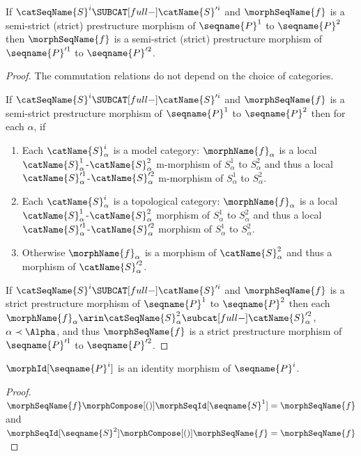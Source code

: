 \documentclass{article}
\begin{document}
\begin{lemma}
If $\catSeqName{S}^i \SUBCAT[full-] \catName{S}'^i$ and
$\morphSeqName{f}$ is a semi-strict (strict) prestructure morphism of
$\seqname{P}^1$ to $\seqname{P}^2$ then $\morphSeqName{f}$ is a
semi-strict (strict) prestructure morphism of $\seqname{P}'^1$ to
$\seqname{P}'^2$.

\begin{proof}
The commutation relations do not depend on the choice of categories.

If $\catSeqName{S}^i \SUBCAT[full-] \catName{S}'^i$ and
$\morphSeqName{f}$ is a semi-strict prestructure morphism of
$\seqname{P}^1$ to $\seqname{P}^2$ then for each $\alpha$, if

\begin{enumerate}
\item Each $\catName{S}^i_\alpha$ is a model category:
$\morphName{f}_\alpha$ is a local
$\catName{S}^1_\alpha$-$\catName{S}^2_\alpha$ m-morphism of
$S^1_\alpha$ to $S^2_\alpha$ and thus a local
$\catName{S}'^1_\alpha$-$\catName{S}'^2_\alpha$ m-morphism of
$S^1_\alpha$ to $S^2_\alpha$.

\item Each $\catName{S}^i_\alpha$ is a topological category:
$\morphName{f}_\alpha$ is a local
$\catName{S}^1_\alpha$-$\catName{S}^2_\alpha$ morphism of
$S^1_\alpha$ to $S^2_\alpha$ and thus a local
$\catName{S}'^1_\alpha$-$\catName{S}'^2_\alpha$ morphism of
$S^1_\alpha$ to $S^2_\alpha$.

\item Otherwise
$\morphName{f}_\alpha$ is a morphism of $\catName{S}^2_\alpha$ and
thus a morphism of $\catName{S}'^2_\alpha$.
\end{enumerate}

If $\catSeqName{S}^i \SUBCAT[full-] \catName{S}'^i$ and
$\morphSeqName{f}$ is a strict prestructure morphism of $\seqname{P}^1$
to $\seqname{P}^2$ then each
$
  \morphName{f}_\alpha \arin \catSeqName{S}^2_\alpha
  \subcat[full-] \catName{S}'^2_\alpha
$,
$\alpha \prec \Alpha$, and thus $\morphSeqName{f}$ is a strict
prestructure morphism of $\seqname{P}'^1$ to $\seqname{P}'^2$.
\end{proof}

$\morphId[{{\seqname{P}^i}}]$ is an identity morphism of $\seqname{P}^i$.

\begin{proof}
$\morphSeqName{f} \morphCompose[()] \morphSeqId[{\seqname{S}^1}] = \morphSeqName{f}$
and
$\morphSeqId[{\seqname{S}^2}] \morphCompose[()] \morphSeqName{f} = \morphSeqName{f}$
\end{proof}
\end{lemma}
\end{document}
